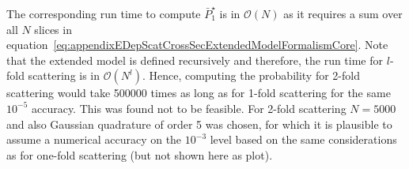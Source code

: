 The corresponding run time to compute $\bar{P}^{\star}_1$ is in $\mathcal{O}(N)$ as it requires a sum over all $N$ slices in equation~\ref{eq:appendixEDepScatCrossSecExtendedModelFormalismCore}. Note that the extended model is defined recursively and therefore, the run time for $l$-fold scattering is in $\mathcal{O}(N^l)$. Hence, computing the probability for 2-fold scattering would take 500000 times as long as for 1-fold scattering for the same $10^{-5}$ accuracy. This was found not to be feasible. For 2-fold scattering $N=5000$ and also Gaussian quadrature of order 5 was chosen, for which it is plausible to assume a numerical accuracy on the $10^{-3}$ level based on the same considerations as for one-fold scattering (but not shown here as plot).
\FloatBarrier